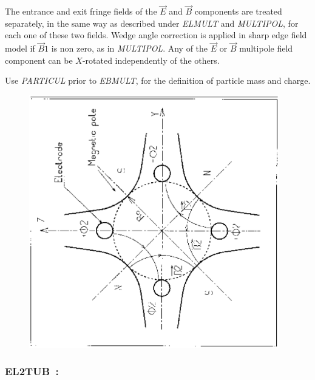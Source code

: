 \bigskip

\noindent The entrance and exit fringe fields of the $ \vec  E $ and $ \vec  B$ components are treated 
separately, in the same way as described under \textsl{ELMULT} 
 and \textsl{MULTIPOL},
for each one of these two fields. Wedge angle correction is applied in sharp edge field model if $ \vec  B1$ is non zero, as in \textsl{MULTIPOL}. Any of the $ \vec  E $ or $ \vec  B $ multipole field
component can be $X$-rotated independently of the others. 

\bigskip

\noindent Use \textsl{PARTICUL} prior to \textsl{EBMULT}, for the 
 definition of  particle mass and charge.
\vfill

\begin{figure}[H]
\centerline{\includegraphics[height=11cm,angle=-90]{Fig20.ps}}
\end{figure}

\newpage

\subsubsection*{EL2TUB~: \ELTwoTUBTitl} \label{EL2TUB} 
\medskip

